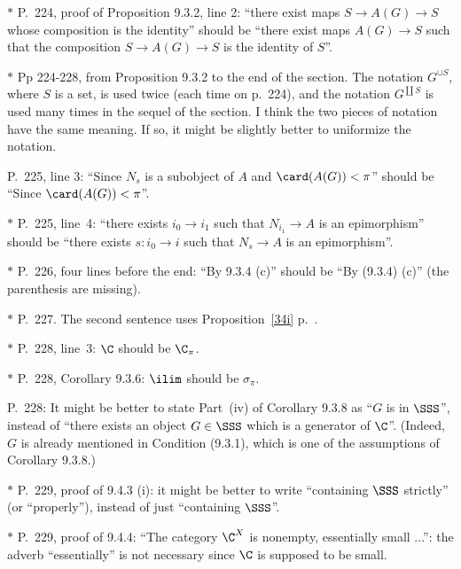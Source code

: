 \documentclass[12pt]{article}
\theoremstyle{remark}
\theoremstyle{definition}
\begin{document}
\nn$*$ P.~224, proof of Proposition 9.3.2, line 2: ``there exist maps $S\to A(G)\to S$ whose composition is the identity'' should be ``there exist maps $A(G)\to S$ such that the composition $S\to A(G)\to S$ is the identity of $S$''.

\nn$*$ Pp 224-228, from Proposition 9.3.2 to the end of the section. The notation $G^{\sqcup S}$, where $S$ is a set, is used twice (each time on p.~224), and the notation $G^{\coprod S}$ is used many times in the sequel of the section. I think the two pieces of notation have the same meaning. If so, it might be slightly better to uniformize the notation.

\begin{s}
P.~225, line 3: ``Since $N_s$ is a subobject of $A$ and $\card(A(G))<\pi$'' should be ``Since $\card(A(G))<\pi$''.

\nn$*$ P.~225, line~4: ``there exists $i_0\to i_1$ such that $N_{i_1}\to A$ is an epimorphism'' should be ``there exists $s:i_0\to i$ such that $N_s\to A$ is an epimorphism''.
\end{s}

\nn$*$ P.~226, four lines before the end: ``By 9.3.4 (c)'' should be ``By (9.3.4) (c)'' (the parenthesis are missing).

\nn$*$ P.~227. The second sentence uses Proposition~\ref{34i} p.~.

\nn$*$ P.~228, line~3: $\C$ should be $\C_\pi$.

\nn$*$ P.~228, Corollary 9.3.6: $\ilim$ should be $\sigma_\pi$.

\begin{s}
P.~228: It might be better to state Part~(iv) of Corollary 9.3.8 as ``$G$ is in $\SSS$'', instead of ``there exists an object $G\in\SSS$ which is a generator of $\C$''. (Indeed, $G$ is already mentioned in Condition (9.3.1), which is one of the assumptions of Corollary 9.3.8.)
\end{s}

\nn$*$ P.~229, proof of 9.4.3 (i): it might be better to write ``containing $\SSS$ strictly'' (or ``properly''), instead of just ``containing $\SSS$''. 

\nn$*$ P.~229, proof of 9.4.4: ``The category $\C^X$ is nonempty, essentially small ...'': the adverb ``essentially'' is not necessary since $\C$ is supposed to be small. 

\end{document}

